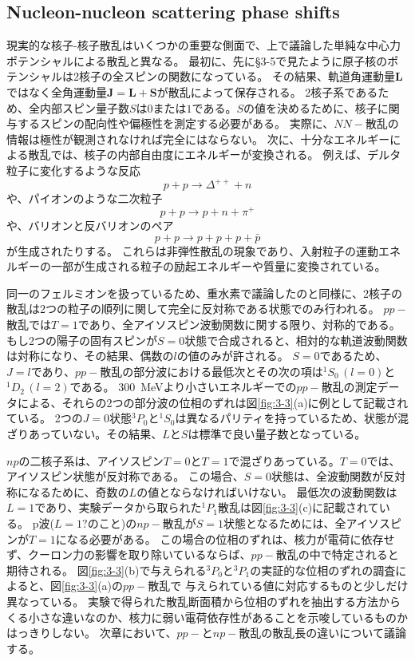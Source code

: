 \documentclass[a4paper,11pt,uplatex]{jsarticle}
\begin{document}
\subsection*{Nucleon-nucleon scattering phase shifts}
現実的な核子-核子散乱はいくつかの重要な側面で、上で議論した単純な中心力ポテンシャルによる散乱と異なる。
最初に、先に\S{3-5}で見たように原子核のポテンシャルは2核子の全スピンの関数になっている。
その結果、軌道角運動量$\bm{L}$ではなく全角運動量$\bm{J}=\bm{L}+\bm{S}$が散乱によって保存される。
2核子系であるため、全内部スピン量子数$S$は$0$または$1$である。$S$の値を決めるために、核子に関与するスピンの配向性や偏極性を測定する必要がある。
実際に、$NN-$散乱の情報は極性が観測されなければ完全にはならない。
次に、十分なエネルギーによる散乱では、核子の内部自由度にエネルギーが変換される。
例えば、デルタ粒子に変化するような反応
\begin{equation}
  p+p\to \Delta^{++}+n
\end{equation}
や、パイオンのような二次粒子
\begin{equation}
  p+p\to p+n+\pi^+
\end{equation}
や、バリオンと反バリオンのペア
\begin{equation}
  p+p\to p+p+p+\bar{p}
\end{equation}
が生成されたりする。
これらは非弾性散乱の現象であり、入射粒子の運動エネルギーの一部が生成される粒子の励起エネルギーや質量に変換されている。

同一のフェルミオンを扱っているため、重水素で議論したのと同様に、2核子の散乱は2つの粒子の順列に関して完全に反対称である状態でのみ行われる。
$pp-$散乱では$T=1$であり、全アイソスピン波動関数に関する限り、対称的である。
もし2つの陽子の固有スピンが$S=0$状態で合成されると、相対的な軌道波動関数は対称になり、その結果、偶数の$l$の値のみが許される。
$S=0$であるため、$J=l$であり、$pp-$散乱の部分波における最低次とその次の項は$^{1}S_0\,(l=0)$と$^{1}D_2\,(l=2)$である。
\SI{300}{MeV}より小さいエネルギーでの$pp-$散乱の測定データによる、それらの2つの部分波の位相のずれは図\ref{fig:3-3}(a)に例として記載されている。
2つの$J=0$状態$^{3}P_0$と$^{1}S_0$は異なるパリティを持っているため、状態が混ざりあっていない。その結果、$L$と$S$は標準で良い量子数となっている。

$np$の二核子系は、アイソスピン$T=0$と$T=1$で混ざりあっている。$T=0$では、アイソスピン状態が反対称である。
この場合、$S=0$状態は、全波動関数が反対称になるために、奇数の$L$の値とならなければいけない。
最低次の波動関数は$L=1$であり、実験データから取られた$^{1}P_1$散乱は図\ref{fig:3-3}(c)に記載されている。
p波($L=1?$のこと)の$np-$散乱が$S=1$状態となるためには、全アイソスピンが$T=1$になる必要がある。
この場合の位相のずれは、核力が電荷に依存せず、クーロン力の影響を取り除いているならば、$pp-$散乱の中で特定されると期待される。
図\ref{fig:3-3}(b)で与えられる$^{3}P_0$と$^{3}P_1$の実証的な位相のずれの調査によると、図\ref{fig:3-3}(a)の$pp-$散乱で
与えられている値に対応するものと少しだけ異なっている。
実験で得られた散乱断面積から位相のずれを抽出する方法からくる小さな違いなのか、核力に弱い電荷依存性があることを示唆しているものかはっきりしない。
次章において、$pp-$と$np-$散乱の散乱長の違いについて議論する。
\end{document}
